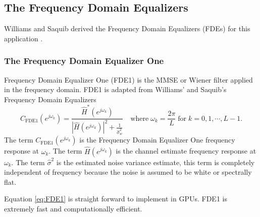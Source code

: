\clearpage
\subsection{The Frequency Domain Equalizers}
Williams and Saquib derived the Frequency Domain Equalizers (FDEs) for this application \cite[]{williams2013linear}.

\subsubsection{The Frequency Domain Equalizer One}
Frequency Domain Equalizer One (FDE1) is the MMSE or Wiener filter applied in the frequency domain.
FDE1 is adapted from Williams' and Saquib's Frequency Domain Equalizers \cite[eq. (11)]{williams2013linear}
\begin{equation}
C_\text{FDE1}(e^{j\omega_k}) = \frac{\hat{H}^\ast(e^{j\omega_k})}  {|\hat{H}(e^{j\omega_k})|^2  +  \frac{1}{\hat{\sigma}^2_w}} \quad
\text{where} \;
\omega_k = \frac{2\pi}{L} \;
\text{for} \;
k=0,1,\cdots,L-1.
\label{eq:FDE1}
\end{equation}
The term $C_\text{FDE1}(e^{j\omega_k})$ is the Frequency Domain Equalizer One frequency response at $\omega_k$.
The term $\hat{H}(e^{j\omega_k})$ is the channel estimate frequency response at $\omega_k$.
The term $\hat{\sigma}^2$ is the estimated noise variance estimate, this term is completely independent of frequency because the noise is assumed to be white or spectrally flat.

Equation \eqref{eq:FDE1} is straight forward to implement in GPUs.
FDE1 is extremely fast and computationally efficient.

